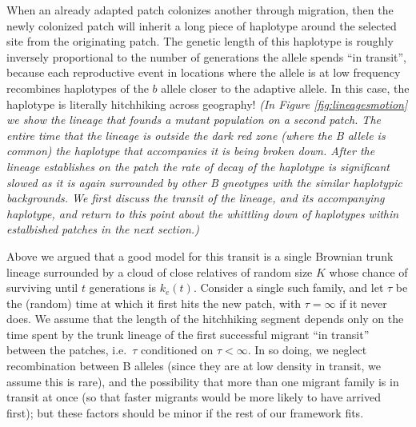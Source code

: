 \documentclass{article}
\newcommand{\gc}[1]{{\it\color{green}(#1)} }
\begin{document}
When an already adapted patch colonizes another through migration,
then the newly colonized patch will inherit a long piece of haplotype around the selected site from the originating patch.
The genetic length of this haplotype is roughly inversely proportional to the
number of generations the allele spends ``in transit'', 
because each reproductive event in locations where the allele is at
low frequency recombines haplotypes of the $b$ allele closer to the
adaptive allele. In this case, the haplotype is literally hitchhiking across geography!
\gc{In Figure \ref{fig:lineagesmotion} we show the lineage that founds a
mutant population on a second patch. The entire time that the lineage
is outside the dark red zone (where the B allele is common) the
haplotype that accompanies it is being broken down. After the lineage
establishes on the patch the rate of decay of the haplotype is
significant slowed as it is again surrounded by other B
gneotypes with the similar haplotypic backgrounds. We first discuss
the transit of the lineage, and its accompanying haplotype, and return
to this point about the whittling down of haplotypes within
estalbished patches in the next section.}


Above we argued that a good model for this transit is a single Brownian trunk lineage
surrounded by a cloud of close relatives of random size $K$
whose chance of surviving until $t$ generations is $k_e(t)$.
Consider a single such family, and let $\tau$ be the (random) time at which it first hits the new patch,
with $\tau = \infty$ if it never does. 
We assume that the length of the hitchhiking segment depends only on 
the time spent by the trunk lineage of the first successful migrant ``in transit'' between the patches,
i.e.\ $\tau$ conditioned on $\tau < \infty$.
In so doing, we neglect 
recombination between B alleles (since they are at low density in transit, we assume this is rare),
and the possibility that more than one migrant family is in transit at once
(so that faster migrants would be more likely to have arrived first);
but these factors should be minor if the rest of our framework fits.
\end{document}
